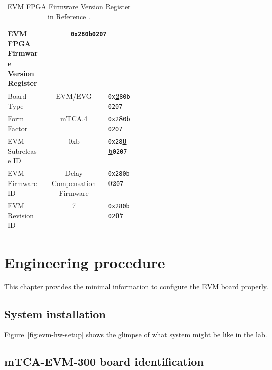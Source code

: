 \documentclass[11pt
  , a4paper
  , article
  , oneside
  , showtrims
]{memoir}
\begin{document}
\begin{table}[!htb]
  \centering
  \begin{tabular}{p{0.3\linewidth}|c|l}
    \toprule
    EVM FPGA Firmware Version Register              & \multicolumn{2}{c}{\texttt{0x280b0207}}             \\\midrule
    Board Type        & EVM/EVG                     &  \texttt{0x}\underline{\textbf{2}}\texttt{80b0207}  \\\midrule
    Form Factor       & mTCA.4                      &  \texttt{0x2}\underline{\textbf{8}}\texttt{0b0207}  \\\midrule
    EVM Subrelease ID & 0xb                         &  \texttt{0x28}\underline{\textbf{0b}}\texttt{0207}  \\\midrule
    EVM Firmware ID   & Delay Compensation Firmware &  \texttt{0x280b}\underline{\textbf{02}}\texttt{07}  \\\midrule
    EVM Revision ID   & 7                           &  \texttt{0x280b02}\underline{\textbf{07}}           \\\bottomrule
  \end{tabular}
  \caption[]{EVM FPGA Firmware Version Register in Reference \citep[see][p37]{MRFEVENTGENERATOR}.}
  \label{table:fwinfo}
\end{table}


\chapter{Engineering procedure}
This chapter provides the minimal information to configure the EVM board properly.\\

\section{System installation}
Figure~\ref{fig:evm-hw-setup} shows the glimpse of what system might be like in the lab.\\


\section{mTCA-EVM-300 board identification}
\end{document}
